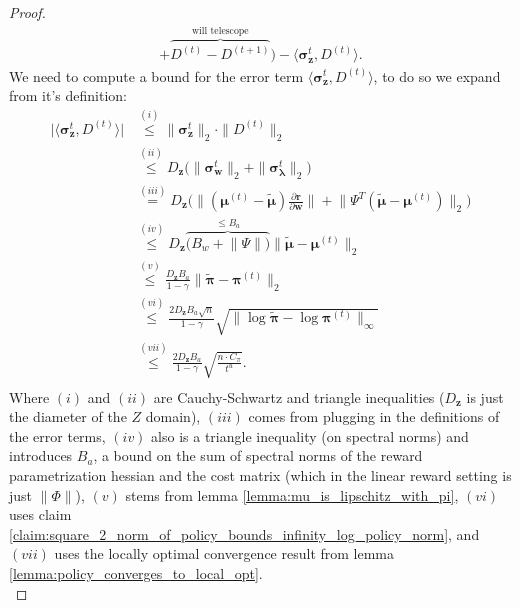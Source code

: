 \begin{proof}
\begin{align*}
         + \overbrace{D^{(t)} - D^{(t+1)}}^\text{will telescope}
     \Big) 
    - \langle \bm{\sigma}_{\bm{z}}^{t}, D^{(t)} \rangle.
\end{align*}
We need to compute a bound for the error term $\langle \bm{\sigma}_{\bm{z}}^{t}, D^{(t)} \rangle$, to do so we expand from it's definition:
\begin{align*}
   \Big| \langle \bm{\sigma}_{\bm{z}}^{t}, D^{(t)} \rangle  \Big|
    &\stackrel{(i)}{\leq}  \|\bm{\sigma}_{\bm{z}}^{t} \|_2 \cdot \| D^{(t)}\|_2\\
    &\stackrel{(ii)}{\leq} D_{\bm{z}} \big(\|\bm{\sigma}_{\bm{w}}^{t} \|_2 + \|\bm{\sigma}_{\bm{\lambda}}^{t} \|_2 \big) \\
    &\stackrel{(iii)}{=} D_{\bm{z}} \Big(
        \Big\|
            (\bm{\mu}^{(t)} - \tilde{\bm{\mu}}) 
            \frac{\partial \bm{r}}{\partial \bm{w}}
        \Big\|
        + \Big\|
            \Psi^T (\tilde{\bm{\mu}}- \bm{\mu}^{(t)})
        \Big\|_2 \Big)\\
    &\stackrel{(iv)}{\leq} D_{\bm{z}} \overbrace{\Big(
        B_w
        + \big\|
            \Psi
        \big\| \Big)}^{
        \leq B_a
        } \| \tilde{\bm{\mu}} - \bm{\mu}^{(t)}\|_2\\
    &\stackrel{(v)}{\leq} 
    \frac{D_{\bm{z}} B_a}{1 - \gamma}
    \| \tilde{\bm{\pi}} - \bm{\pi}^{(t)}\|_2 
    \\
    &\stackrel{(vi)}{\leq}
    \frac{2 D_{\bm{z}} B_a \sqrt{n}}{1 - \gamma}
    \sqrt{\| \log \tilde{\bm{\pi}} - \log \bm{\pi}^{(t)}\|_\infty} \\
    &\stackrel{(vii)}{\leq} 
    \frac{2 D_{\bm{z}} B_a}{1 - \gamma}
    \sqrt{\frac{n \cdot C_\pi}{t^{u}}}. \\
\end{align*}
Where $(i)$ and $(ii)$ are Cauchy-Schwartz and triangle inequalities ($D_{\bm{z}}$ is just the diameter of the $Z$ domain), $(iii)$ comes from plugging in the definitions of the error terms, $(iv)$ also is a triangle inequality (on spectral norms) and introduces $B_a$, a bound on the sum of spectral norms of the reward parametrization hessian and the cost matrix (which in the linear reward setting is just $\|\Phi\|$), $(v)$ stems from lemma \ref{lemma:mu_is_lipschitz_with_pi}, $(vi)$ uses claim \ref{claim:square_2_norm_of_policy_bounds_infinity_log_policy_norm}, and $(vii)$ uses the locally optimal convergence result from lemma \ref{lemma:policy_converges_to_local_opt}. \\


\end{proof}
